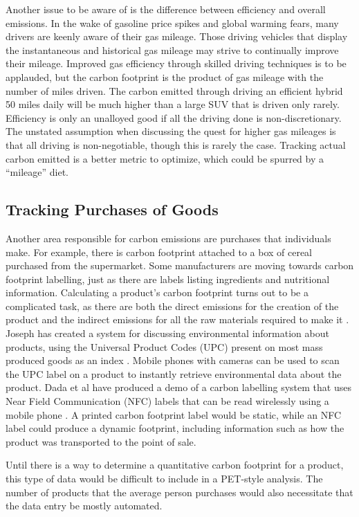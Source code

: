 Another issue to be aware of is the difference between efficiency and overall emissions. In the wake of gasoline price spikes and global warming fears, many drivers are keenly aware of their gas mileage. Those driving vehicles that display the instantaneous and historical gas mileage may strive to continually improve their mileage. Improved gas efficiency through skilled driving techniques is to be applauded, but the carbon footprint is the product of gas mileage with the number of miles driven. The carbon emitted through driving an efficient hybrid 50 miles daily will be much higher than a large SUV that is  driven only rarely. Efficiency is only an unalloyed good if all the driving done is non-discretionary. The unstated assumption when discussing the quest for higher gas mileages is that all driving is non-negotiable, though this is rarely the case. Tracking actual carbon emitted is a better metric to optimize, which could be spurred by a ``mileage'' diet.

\subsection{Tracking Purchases of Goods}
Another area responsible for carbon emissions are purchases that individuals make. For example, there is carbon footprint attached to a box of cereal purchased from the supermarket. Some manufacturers are moving towards carbon footprint labelling, just as there are labels listing ingredients and nutritional information. Calculating a product's carbon footprint turns out to be a complicated task, as there are both the direct emissions for the creation of the product and the indirect emissions for all the raw materials required to make it \cite{Wiedmann2007carbon-footprint}. Joseph has created a system for discussing environmental information about products, using the Universal Product Codes (UPC) present on most mass produced goods as an index \cite{Joseph2009Ecoproductpedia}. Mobile phones with cameras can be used to scan the UPC label on a product to instantly retrieve environmental data about the product. Dada et al have produced a demo of a carbon labelling system that uses Near Field Communication (NFC) labels that can be read wirelessly using a mobile phone \cite{dada-demo-pervasive-2008}. A printed carbon footprint label would be static, while an NFC label could produce a dynamic footprint, including information such as how the product was transported to the point of sale.

Until there is a way to determine a quantitative carbon footprint for a product, this type of data would be difficult to include in a PET-style analysis. The number of products that the average person purchases would also necessitate that the data entry be mostly automated.

